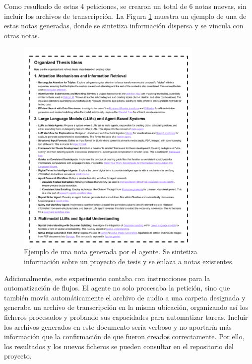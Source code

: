 \newpage

Como resultado de estas 4 peticiones, se crearon un total de 6 notas nuevas, sin incluir los archivos de transcripción. La Figura \ref{fig:para_synthesis} muestra un ejemplo de una de estas notas generadas, donde se sintetiza información dispersa y se vincula con otras notas.

\begin{figure}[h!]
    \centering
    \includegraphics[width=0.8\textwidth]{figures/ideaSynthBx.pdf} 
    \caption{Ejemplo de una nota generada por el agente. Se sintetiza información sobre un proyecto de tesis y se enlaza a notas existentes.}
    \label{fig:para_synthesis}
\end{figure}

Adicionalmente, este experimento contaba con instrucciones para la automatización de flujos. El agente no solo procesaba la petición, sino que también movía automáticamente el archivo de audio a una carpeta designada y generaba un archivo de transcripción en la misma ubicación, organizando así los ficheros procesados y probando sus capacidades para automatizar tareas. Incluir los archivos generados en este documento sería verboso y no aportaría más información que la confirmación de que fueron creados correctamente. Por ello, los resultados y los nuevos ficheros se pueden consultar en el repositorio del proyecto.

